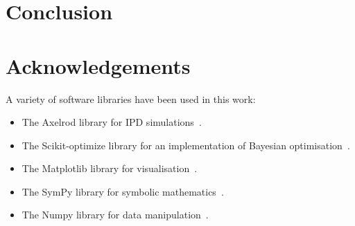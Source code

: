\documentclass[10pt]{article}
\begin{document}
\section{Conclusion}




\section{Acknowledgements}

A variety of software libraries have been used in this work:

\begin{itemize}
    \item The Axelrod library for IPD simulations~\cite{axelrodproject}.
    \item The Scikit-optimize library for an implementation of Bayesian optimisation~\cite{tim_head_2018_1207017}.
    \item The Matplotlib library for visualisation~\cite{hunter2007matplotlib}.
    \item The SymPy library for symbolic mathematics~\cite{sympy}.
    \item The Numpy library for data manipulation~\cite{walt2011numpy}.
\end{itemize}
\end{document}
